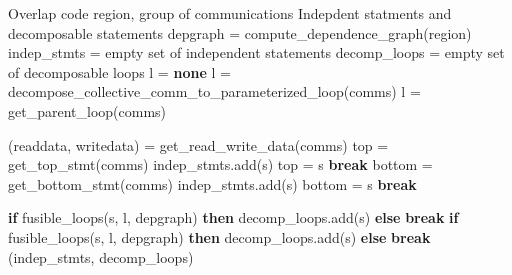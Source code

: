 \begin{algorithm}
{\scriptsize
\begin{algorithmic}
\Require Overlap code region, group of communications
\Ensure Indepdent statments and decomposable statements
  \State depgraph = compute\_dependence\_graph(region)
  \State indep\_stmts = empty set of independent statements
  \State decomp\_loops = empty set of decomposable loops
  \State {}
  \State l = \textbf{none}
    \State {}
    \State l = decompose\_collective\_comm\_to\_parameterized\_loop(comms)
    \State {}
    \State l = get\_parent\_loop(comms)
  \EndIf

\color{purple}
  \State {}
  \State (readdata, writedata) = get\_read\_write\_data(comms) 
  \State top = get\_top\_stmt(comms)
      \State indep\_stmts.add(s)
      \State top = s
    \Else
      \State \textbf{break}
    \EndIf
  \EndFor
  \State bottom = get\_bottom\_stmt(comms)
      \State indep\_stmts.add(s)
      \State bottom = s
    \Else
      \State \textbf{break}
    \EndIf
  \EndFor

  \State {}
      \State \textbf{if} fusible\_loops(s, l, depgraph) \textbf{then} decomp\_loops.add(s)
      \State \textbf{else} \textbf{break}
    \EndFor
      \State \textbf{if} fusible\_loops(s, l, depgraph) \textbf{then} decomp\_loops.add(s)
      \State \textbf{else} \textbf{break}
    \EndFor
  \EndIf
  \State \Return (indep\_stmts, decomp\_loops)


\end{algorithmic}}
\end{algorithm}
